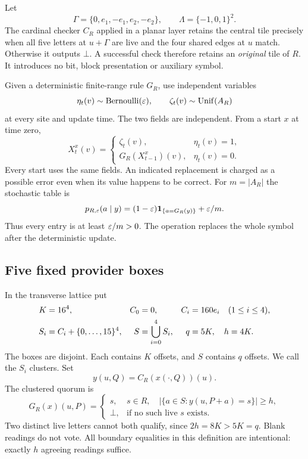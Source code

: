 Let
\[
 \Gamma=\{0,e_1,-e_1,e_2,-e_2\},\qquad
 \Lambda=\{-1,0,1\}^2.
\]
The cardinal checker $C_R$ applied in a planar layer retains the central tile precisely when all five letters at $u+\Gamma$ are live and the four shared edges at $u$ match. Otherwise it outputs $\bot$. A successful check therefore retains an \emph{original} tile of $R$. It introduces no bit, block presentation or auxiliary symbol.

Given a deterministic finite-range rule $G_R$, use independent variables
\[
 \eta_t(v)\sim\operatorname{Bernoulli}(\varepsilon),\qquad
 \zeta_t(v)\sim\operatorname{Unif}(A_R)
\]
at every site and update time. The two fields are independent. From a start $x$ at time zero,
\begin{equation}\label{nw:update}
 X_t^x(v)=
 \begin{cases}
 \zeta_t(v),&\eta_t(v)=1,\\
 G_R(X_{t-1}^x)(v),&\eta_t(v)=0.
 \end{cases}
\end{equation}
Every start uses the same fields. An indicated replacement is charged as a possible error even when its value happens to be correct. For $m=|A_R|$ the stochastic table is
\begin{equation}\label{nw:table}
 p_{R,\varepsilon}(a\mid y)=(1-\varepsilon)\mathbf1_{\{a=G_R(y)\}}+\varepsilon/m.
\end{equation}
Thus every entry is at least $\varepsilon/m>0$. The operation replaces the whole symbol after the deterministic update.

\subsection{Five fixed provider boxes}

In the transverse lattice put
\begin{align}\label{nw:boxes}
 K&=16^4,& C_0&=0,& C_i&=160e_i\quad(1\le i\le4),\notag\\
 S_i&=C_i+\{0,\ldots,15\}^4,&S&=\bigcup_{i=0}^4 S_i,&q&=5K,\quad h=4K.
\end{align}
The boxes are disjoint. Each contains $K$ offsets, and $S$ contains $q$ offsets. We call the $S_i$ clusters. Set
\[
 y(u,Q)=C_R(x(\cdot,Q))(u).
\]
The clustered quorum is
\begin{equation}\label{nw:rule}
 G_R(x)(u,P)=
 \begin{cases}
 s,&s\in R,\quad|\{a\in S:y(u,P+a)=s\}|\ge h,\\
 \bot,&\text{if no such live }s\text{ exists}.
 \end{cases}
\end{equation}
Two distinct live letters cannot both qualify, since $2h=8K>5K=q$. Blank readings do not vote. All boundary equalities in this definition are intentional: exactly $h$ agreeing readings suffice.

